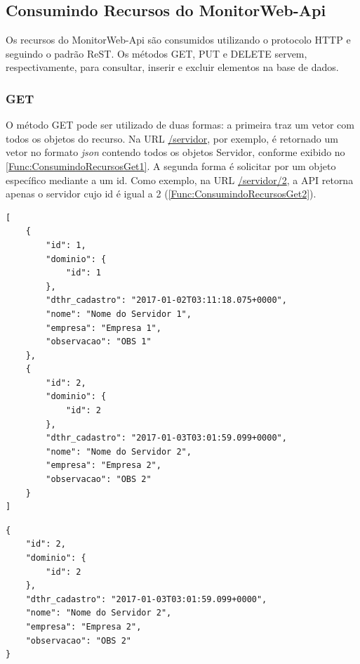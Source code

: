 \subsection{Consumindo Recursos do MonitorWeb-Api}\label{subsec:ConsumindoRecursos}

Os recursos do MonitorWeb-Api são consumidos utilizando o protocolo HTTP e seguindo o padrão ReST. Os métodos GET, PUT e DELETE servem, respectivamente, para consultar, inserir e excluir elementos na base de dados.

\subsubsection{GET}
O método GET pode ser utilizado de duas formas: a primeira traz um vetor com todos os objetos do recurso. Na URL \url{/servidor}, por exemplo, é retornado um vetor no formato \textit{json} contendo todos os objetos Servidor, conforme exibido no \autoref{Func:ConsumindoRecursosGet1}. A segunda forma é solicitar por um objeto específico mediante a um id. Como exemplo, na URL \url{/servidor/2}, a API retorna apenas o servidor cujo id é igual a 2 (\autoref{Func:ConsumindoRecursosGet2}).

\begin{lstlisting}[label=Func:ConsumindoRecursosGet1,caption={[Exemplo do vetor de resposta à solicitação GET para URL \url{/servidor}.]Exemplo do vetor de resposta à solicitação GET para URL \url{/servidor}.}]
[
    {
        "id": 1,
        "dominio": {
            "id": 1
        },
        "dthr_cadastro": "2017-01-02T03:11:18.075+0000",
        "nome": "Nome do Servidor 1",
        "empresa": "Empresa 1",
        "observacao": "OBS 1"
    },
    {
        "id": 2,
        "dominio": {
            "id": 2
        },
        "dthr_cadastro": "2017-01-03T03:01:59.099+0000",
        "nome": "Nome do Servidor 2",
        "empresa": "Empresa 2",
        "observacao": "OBS 2"
    }
]    
\end{lstlisting}





\begin{lstlisting}[label=Func:ConsumindoRecursosGet2,caption={[Exemplo do objeto de resposta a solicitação GET para URL \url{/servidor/2}.]Exemplo do objeto de resposta a solicitação GET para URL \url{/servidor/2}.}]
{
    "id": 2,
    "dominio": {
        "id": 2
    },
    "dthr_cadastro": "2017-01-03T03:01:59.099+0000",
    "nome": "Nome do Servidor 2",
    "empresa": "Empresa 2",
    "observacao": "OBS 2"
}
\end{lstlisting}

